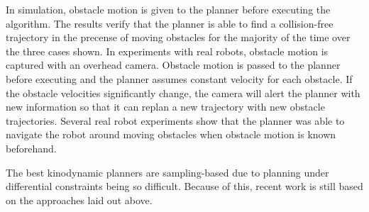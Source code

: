 In simulation, obstacle motion is given to the planner before executing the algorithm. The results verify that the planner is able to find a collision-free trajectory in the precense of moving obstacles for the majority of the time over the three cases shown. In experiments with real robots, obstacle motion is captured with an overhead camera. Obstacle motion is passed to the planner before executing and the planner assumes constant velocity for each obstacle. If the obstacle velocities significantly change, the camera will alert the planner with new information so that it can replan a new trajectory with new obstacle trajectories. Several real robot experiments show that the planner was able to navigate the robot around moving obstacles when obstacle motion is known beforehand.

The best kinodynamic planners are sampling-based due to planning under differential constraints being so difficult. Because of this, recent work is still based on the approaches laid out above.